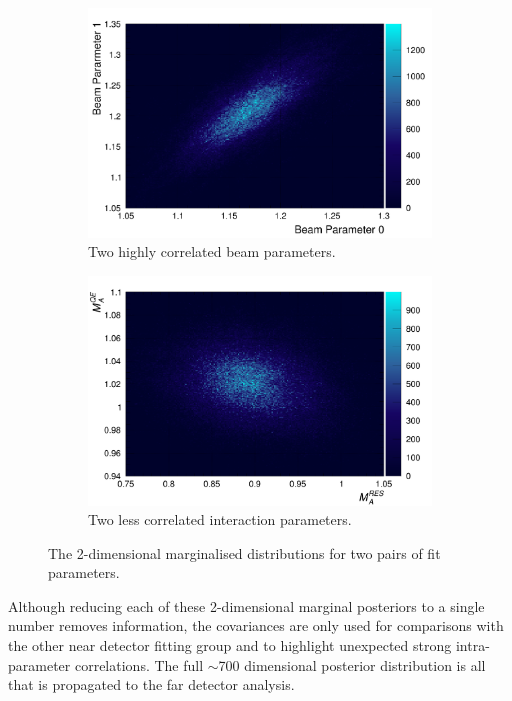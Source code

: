 \begin{figure}
\centering
\begin{subfigure}{.5\textwidth}
  \centering
  \includegraphics[width=0.95\linewidth]{figs/corr1}
  \caption{Two highly correlated beam parameters.}
  \label{fig:corr1}
\end{subfigure}%
\begin{subfigure}{.5\textwidth}
  \centering
  \includegraphics[width=0.95\linewidth]{figs/corr2}
  \caption{Two less correlated interaction parameters.}
  \label{fig:corr2}
\end{subfigure}
\caption{The 2-dimensional marginalised distributions for two pairs of fit parameters.}
\label{fig:corrs}
\end{figure}

Although reducing each of these 2-dimensional marginal posteriors to a single number removes information, the covariances are only used for comparisons with the other near detector fitting group and to highlight unexpected strong intra-parameter correlations. The full $\sim$700 dimensional posterior distribution is all that is propagated to the far detector analysis.

